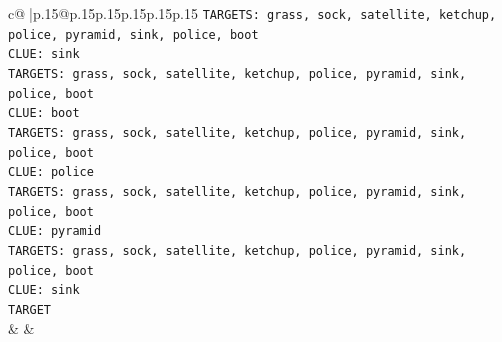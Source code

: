 \documentclass{article}
\begin{document}
{\begin{supertabular}{c@{$\;$}|p{.15\linewidth}@{}p{.15\linewidth}p{.15\linewidth}p{.15\linewidth}p{.15\linewidth}p{.15\linewidth}}
{{{\texttt{TARGETS: grass, sock, satellite, ketchup, police, pyramid, sink, police, boot} \\
\texttt{CLUE: sink} \\
\texttt{TARGETS: grass, sock, satellite, ketchup, police, pyramid, sink, police, boot} \\
\texttt{CLUE: boot} \\
\texttt{TARGETS: grass, sock, satellite, ketchup, police, pyramid, sink, police, boot} \\
\texttt{CLUE: police} \\
\texttt{TARGETS: grass, sock, satellite, ketchup, police, pyramid, sink, police, boot} \\
\texttt{CLUE: pyramid} \\
\texttt{TARGETS: grass, sock, satellite, ketchup, police, pyramid, sink, police, boot} \\
\texttt{CLUE: sink} \\
\texttt{TARGET} \\
            }
        }
    }
    & & \\ \\


\end{supertabular}}
\end{document}
